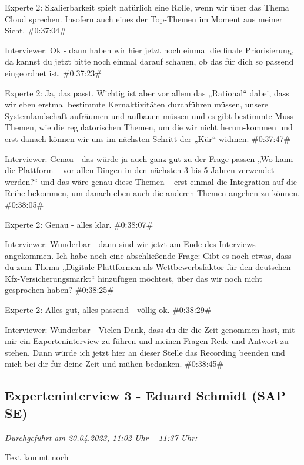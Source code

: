 Experte 2:
Skalierbarkeit spielt natürlich eine Rolle, wenn wir über das Thema Cloud sprechen. Insofern auch eines der Top-Themen im Moment aus meiner Sicht.
\#0:37:04\#

Interviewer:
Ok - dann haben wir hier jetzt noch einmal die finale Priorisierung, da kannst du jetzt bitte noch einmal darauf schauen, ob das für dich so passend eingeordnet ist.
\#0:37:23\#

Experte 2:
Ja, das passt. Wichtig ist aber vor allem das „Rational“ dabei, dass wir eben erstmal bestimmte Kernaktivitäten durchführen müssen, unsere Systemlandschaft aufräumen und aufbauen müssen und es gibt bestimmte Muss-Themen, wie die regulatorischen Themen, um die wir nicht herum-kommen und erst danach können wir uns im nächsten Schritt der „Kür“ widmen. 
\#0:37:47\#

Interviewer:
Genau - das würde ja auch ganz gut zu der Frage passen „Wo kann die Plattform – vor allen Dingen in den nächsten 3 bis 5 Jahren verwendet werden?“ und das wäre genau diese Themen – erst einmal die Integration auf die Reihe bekommen, um danach eben auch die anderen Themen angehen zu können.
\#0:38:05\#

Experte 2:
Genau - alles klar.
\#0:38:07\#

Interviewer:
Wunderbar - dann sind wir jetzt am Ende des Interviews angekommen. Ich habe noch eine abschließende Frage: Gibt es noch etwas, dass du zum Thema „Digitale Plattformen als Wettbewerbsfaktor für den deutschen Kfz-Versicherungsmarkt“ hinzufügen möchtest, über das wir noch nicht gesprochen haben?
\#0:38:25\#

Experte 2:
Alles gut, alles passend - völlig ok.
\#0:38:29\#

Interviewer:
Wunderbar - Vielen Dank, dass du dir die Zeit genommen hast, mit mir ein Experteninterview zu führen und meinen Fragen Rede und Antwort zu stehen. Dann würde ich jetzt hier an dieser Stelle das Recording beenden und mich bei dir für deine Zeit und mühen bedanken.
\#0:38:45\#



\newpage
\subsection{Experteninterview 3 - Eduard Schmidt (SAP SE)}

\textit{Durchgeführt am 20.04.2023, 11:02 Uhr -- 11:37 Uhr:}

Text kommt noch

\newpage


